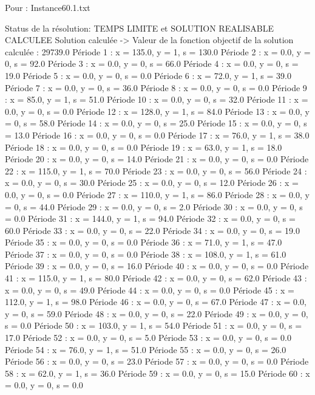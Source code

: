 Pour : Instance60.1.txt

Status de la résolution: TEMPS LIMITE et SOLUTION REALISABLE CALCULEE
Solution calculée
-> Valeur de la fonction objectif de la solution calculée :  29739.0
Période 1 : x = 135.0, y = 1, s = 130.0
Période 2 : x = 0.0, y = 0, s = 92.0
Période 3 : x = 0.0, y = 0, s = 66.0
Période 4 : x = 0.0, y = 0, s = 19.0
Période 5 : x = 0.0, y = 0, s = 0.0
Période 6 : x = 72.0, y = 1, s = 39.0
Période 7 : x = 0.0, y = 0, s = 36.0
Période 8 : x = 0.0, y = 0, s = 0.0
Période 9 : x = 85.0, y = 1, s = 51.0
Période 10 : x = 0.0, y = 0, s = 32.0
Période 11 : x = 0.0, y = 0, s = 0.0
Période 12 : x = 128.0, y = 1, s = 84.0
Période 13 : x = 0.0, y = 0, s = 58.0
Période 14 : x = 0.0, y = 0, s = 25.0
Période 15 : x = 0.0, y = 0, s = 13.0
Période 16 : x = 0.0, y = 0, s = 0.0
Période 17 : x = 76.0, y = 1, s = 38.0
Période 18 : x = 0.0, y = 0, s = 0.0
Période 19 : x = 63.0, y = 1, s = 18.0
Période 20 : x = 0.0, y = 0, s = 14.0
Période 21 : x = 0.0, y = 0, s = 0.0
Période 22 : x = 115.0, y = 1, s = 70.0
Période 23 : x = 0.0, y = 0, s = 56.0
Période 24 : x = 0.0, y = 0, s = 30.0
Période 25 : x = 0.0, y = 0, s = 12.0
Période 26 : x = 0.0, y = 0, s = 0.0
Période 27 : x = 110.0, y = 1, s = 86.0
Période 28 : x = 0.0, y = 0, s = 44.0
Période 29 : x = 0.0, y = 0, s = 2.0
Période 30 : x = 0.0, y = 0, s = 0.0
Période 31 : x = 144.0, y = 1, s = 94.0
Période 32 : x = 0.0, y = 0, s = 60.0
Période 33 : x = 0.0, y = 0, s = 22.0
Période 34 : x = 0.0, y = 0, s = 19.0
Période 35 : x = 0.0, y = 0, s = 0.0
Période 36 : x = 71.0, y = 1, s = 47.0
Période 37 : x = 0.0, y = 0, s = 0.0
Période 38 : x = 108.0, y = 1, s = 61.0
Période 39 : x = 0.0, y = 0, s = 16.0
Période 40 : x = 0.0, y = 0, s = 0.0
Période 41 : x = 115.0, y = 1, s = 80.0
Période 42 : x = 0.0, y = 0, s = 62.0
Période 43 : x = 0.0, y = 0, s = 49.0
Période 44 : x = 0.0, y = 0, s = 0.0
Période 45 : x = 112.0, y = 1, s = 98.0
Période 46 : x = 0.0, y = 0, s = 67.0
Période 47 : x = 0.0, y = 0, s = 59.0
Période 48 : x = 0.0, y = 0, s = 22.0
Période 49 : x = 0.0, y = 0, s = 0.0
Période 50 : x = 103.0, y = 1, s = 54.0
Période 51 : x = 0.0, y = 0, s = 17.0
Période 52 : x = 0.0, y = 0, s = 5.0
Période 53 : x = 0.0, y = 0, s = 0.0
Période 54 : x = 76.0, y = 1, s = 51.0
Période 55 : x = 0.0, y = 0, s = 26.0
Période 56 : x = 0.0, y = 0, s = 23.0
Période 57 : x = 0.0, y = 0, s = 0.0
Période 58 : x = 62.0, y = 1, s = 36.0
Période 59 : x = 0.0, y = 0, s = 15.0
Période 60 : x = 0.0, y = 0, s = 0.0

